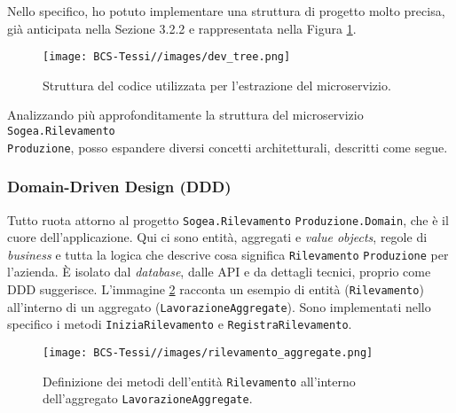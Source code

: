         \noindent Nello specifico, ho potuto implementare una struttura di progetto molto precisa, già anticipata nella Sezione 3.2.2 e rappresentata nella Figura \ref{fig:code-structure}.

         
        \begin{figure}[H]
            \centering
            \texttt{[image: BCS-Tessi//images/dev\_tree.png]}
            \caption{Struttura del codice utilizzata per l'estrazione del microservizio.}
            \label{fig:code-structure}
        \end{figure}

        \vspace{0.2 em}
        \noindent Analizzando più approfonditamente la struttura del microservizio \texttt{Sogea.Rilevamento} \\
        \noindent \texttt{Produzione}, posso espandere diversi concetti architetturali, descritti come segue. 
            \subsubsection{Domain-Driven Design (DDD)}
            Tutto ruota attorno al progetto \texttt{Sogea.}\texttt{Rilevamento}  \texttt{Produzione.}\texttt{Domain}, che è il cuore dell'applicazione. Qui ci sono entità, aggregati e \textit{value objects}, regole di \textit{business} e tutta la logica che descrive cosa significa \texttt{Rilevamento} \texttt{Produzione} per l'azienda. È isolato dal \textit{database}, dalle API e da dettagli tecnici, proprio come DDD suggerisce. L'immagine \ref{fig:rilevamento-aggregate} racconta un esempio di entità (\texttt{Rilevamento}) all'interno di un aggregato (\texttt{Lavorazione}\texttt{Aggregate}). Sono implementati nello specifico i metodi \texttt{Inizia}\texttt{Rilevamento} e \texttt{Registra}\texttt{Rilevamento}. 

            \begin{figure}[H]
                \centering
                \texttt{[image: BCS-Tessi//images/rilevamento\_aggregate.png]}
                \caption[Definizione dei metodi di \texttt{Rilevamento}]{Definizione dei metodi dell'entità \texttt{Rilevamento} all'interno dell'aggregato \texttt{LavorazioneAggregate}.}
                \label{fig:rilevamento-aggregate}
            \end{figure}
            
